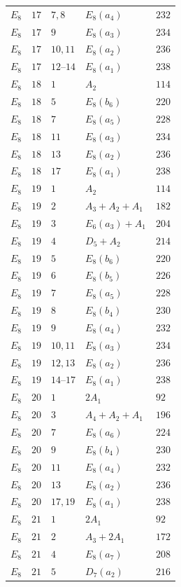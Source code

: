 \documentclass[11pt,a4paper]{amsart}
\numberwithin{equation}{section}
\theoremstyle{definition}
\theoremstyle{remark}
\begin{document}
{\begin{longtable}{@{}p{}p{}p{}p{}p{}@{}}
$E_{8}$&$17$&$7,8$&$E_{8}(a_{4})$&$232$\\
$E_{8}$&$17$&$9$&$E_{8}(a_{3})$&$234$\\
$E_{8}$&$17$&$10,11$&$E_{8}(a_{2})$&$236$\\
$E_{8}$&$17$&$12\text{--}14$&$E_{8}(a_{1})$&$238$\\
$E_{8}$&$18$&$1$&$A_{2}$&$114$\\
$E_{8}$&$18$&$5$&$E_{8}(b_{6})$&$220$\\
$E_{8}$&$18$&$7$&$E_{8}(a_{5})$&$228$\\
$E_{8}$&$18$&$11$&$E_{8}(a_{3})$&$234$\\
$E_{8}$&$18$&$13$&$E_{8}(a_{2})$&$236$\\
$E_{8}$&$18$&$17$&$E_{8}(a_{1})$&$238$\\
$E_{8}$&$19$&$1$&$A_{2}$&$114$\\
$E_{8}$&$19$&$2$&$A_{3}+A_{2}+A_{1}$&$182$\\
$E_{8}$&$19$&$3$&$E_{6}(a_{3})+A_{1}$&$204$\\
$E_{8}$&$19$&$4$&$D_{5}+A_{2}$&$214$\\
$E_{8}$&$19$&$5$&$E_{8}(b_{6})$&$220$\\
$E_{8}$&$19$&$6$&$E_{8}(b_{5})$&$226$\\
$E_{8}$&$19$&$7$&$E_{8}(a_{5})$&$228$\\
$E_{8}$&$19$&$8$&$E_{8}(b_{4})$&$230$\\
$E_{8}$&$19$&$9$&$E_{8}(a_{4})$&$232$\\
$E_{8}$&$19$&$10,11$&$E_{8}(a_{3})$&$234$\\
$E_{8}$&$19$&$12,13$&$E_{8}(a_{2})$&$236$\\
$E_{8}$&$19$&$14\text{--}17$&$E_{8}(a_{1})$&$238$\\
$E_{8}$&$20$&$1$&$2A_{1}$&$92$\\
$E_{8}$&$20$&$3$&$A_{4}+A_{2}+A_{1}$&$196$\\
$E_{8}$&$20$&$7$&$E_{8}(a_{6})$&$224$\\
$E_{8}$&$20$&$9$&$E_{8}(b_{4})$&$230$\\
$E_{8}$&$20$&$11$&$E_{8}(a_{4})$&$232$\\
$E_{8}$&$20$&$13$&$E_{8}(a_{2})$&$236$\\
$E_{8}$&$20$&$17,19$&$E_{8}(a_{1})$&$238$\\
$E_{8}$&$21$&$1$&$2A_{1}$&$92$\\
$E_{8}$&$21$&$2$&$A_{3}+2A_{1}$&$172$\\
$E_{8}$&$21$&$4$&$E_{8}(a_{7})$&$208$\\
$E_{8}$&$21$&$5$&$D_{7}(a_{2})$&$216$\\

\end{longtable}}
\end{document}
